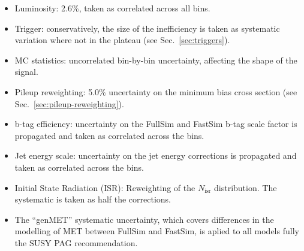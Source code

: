 \begin{itemize}
    \item Luminosity: 2.6\%, taken as correlated across all bins.
    \item Trigger: conservatively, the size of the inefficiency is taken as
        systematic variation where not in the plateau (see Sec.~\ref{sec:triggers}).
    \item MC statistics:  uncorrelated bin-by-bin uncertainty, affecting the
        shape of the signal.
    \item Pileup reweighting: 5.0\% uncertainty on the minimum bias cross section
        (see Sec.~\ref{sec:pileup-reweighting}).
    \item b-tag efficiency: uncertainty on the FullSim and FastSim b-tag scale
        factor is propagated and taken as correlated across the bins.
    \item Jet energy scale: uncertainty on the jet energy corrections is
        propagated and taken as correlated across the bins.
    \item Initial State Radiation (ISR): Reweighting of the $N_{\text{isr}}$
        distribution. The systematic is taken as half the corrections.
    \item The ``genMET'' systematic uncertainty, which covers
      differences in the modelling of MET between FullSim and FastSim,
      is aplied to all models fully the SUSY PAG recommendation. 
\end{itemize}

